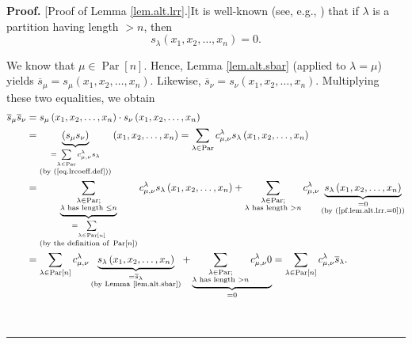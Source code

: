 \documentclass[numbers=enddot,12pt,final,onecolumn,notitlepage]{scrartcl}%
\theoremstyle{definition}
\newenvironment{proof}[1][Proof]{\noindent\textbf{#1.} }{\ \rule{0.5em}{0.5em}}
\let\sumnonlimits\sum
\renewcommand{\sum}{\sumnonlimits\limits}
\newenvironment{vershort}{}{}
\begin{document}
\begin{proof}
[Proof of Lemma \ref{lem.alt.lrr}.]It is well-known (see, e.g., \cite[Exercise
2.3.8(b)]{GriRei}) that if $\lambda$ is a partition having length $>n$, then%
\begin{equation}
s_{\lambda}\left(  x_{1},x_{2},\ldots,x_{n}\right)  =0.
\label{pf.lem.alt.lrr.=0}%
\end{equation}


\begin{vershort}
We know that $\mu\in\operatorname*{Par}\left[  n\right]  $. Hence, Lemma
\ref{lem.alt.sbar} (applied to $\lambda=\mu$) yields $\overline{s}_{\mu
}=s_{\mu}\left(  x_{1},x_{2},\ldots,x_{n}\right)  $. Likewise, $\overline
{s}_{\nu}=s_{\nu}\left(  x_{1},x_{2},\ldots,x_{n}\right)  $. Multiplying these
two equalities, we obtain%
\begin{align*}
\overline{s}_{\mu}\overline{s}_{\nu}  &  =s_{\mu}\left(  x_{1},x_{2}%
,\ldots,x_{n}\right)  \cdot s_{\nu}\left(  x_{1},x_{2},\ldots,x_{n}\right) \\
&  =\underbrace{\left(  s_{\mu}s_{\nu}\right)  }_{\substack{=\sum_{\lambda
\in\operatorname*{Par}}c_{\mu,\nu}^{\lambda}s_{\lambda}\\\text{(by
(\ref{eq.lrcoeff.def}))}}}\left(  x_{1},x_{2},\ldots,x_{n}\right)
=\sum_{\lambda\in\operatorname*{Par}}c_{\mu,\nu}^{\lambda}s_{\lambda}\left(
x_{1},x_{2},\ldots,x_{n}\right) \\
&  =\underbrace{\sum_{\substack{\lambda\in\operatorname*{Par};\\\lambda\text{
has length }\leq n}}}_{\substack{=\sum_{\lambda\in\operatorname*{Par}\left[
n\right]  }\\\text{(by the definition of }\operatorname*{Par}\left[  n\right]
\text{)}}}c_{\mu,\nu}^{\lambda}s_{\lambda}\left(  x_{1},x_{2},\ldots
,x_{n}\right)  +\sum_{\substack{\lambda\in\operatorname*{Par};\\\lambda\text{
has length }>n}}c_{\mu,\nu}^{\lambda}\underbrace{s_{\lambda}\left(
x_{1},x_{2},\ldots,x_{n}\right)  }_{\substack{=0\\\text{(by
(\ref{pf.lem.alt.lrr.=0}))}}}\\
&  =\sum_{\lambda\in\operatorname*{Par}\left[  n\right]  }c_{\mu,\nu}%
^{\lambda}\underbrace{s_{\lambda}\left(  x_{1},x_{2},\ldots,x_{n}\right)
}_{\substack{=\overline{s}_{\lambda}\\\text{(by Lemma \ref{lem.alt.sbar})}%
}}+\underbrace{\sum_{\substack{\lambda\in\operatorname*{Par};\\\lambda\text{
has length }>n}}c_{\mu,\nu}^{\lambda}0}_{=0}=\sum_{\lambda\in
\operatorname*{Par}\left[  n\right]  }c_{\mu,\nu}^{\lambda}\overline
{s}_{\lambda}.
\end{align*}


\end{vershort}
\end{proof}
\end{document}
